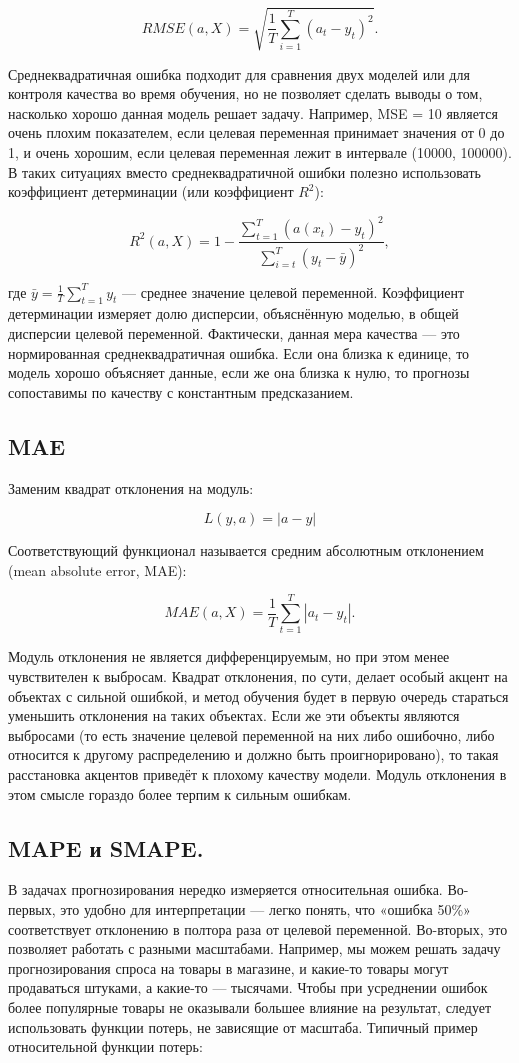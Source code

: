 \[
  RMSE(a, X) = \sqrt{\frac{1}{T} \sum_{i=1}^{T} (a_t - y_t)^2}.
\]

Среднеквадратичная ошибка подходит для сравнения двух моделей или для
контроля качества во время обучения, но не позволяет сделать выводы о
том, насколько хорошо данная модель решает задачу. Например, MSE = 10
является очень плохим показателем, если целевая переменная принимает
значения от 0 до 1, и очень хорошим, если целевая переменная лежит в
интервале (10000, 100000). В таких ситуациях вместо
среднеквадратичной ошибки полезно использовать коэффициент
детерминации (или коэффициент $R^2$):

\[
  R^2(a, X) = 1 - \frac{\sum_{t=1}^{T} (a(x_t) -
  y_t)^2}{\sum_{i=t}^{T} (y_t - \bar{y})^2},
\]

где $\bar{y} = \frac{1}{T} \sum_{t=1}^{T} y_t$ — среднее значение
целевой переменной. Коэффициент детерминации измеряет долю дисперсии,
объяснённую моделью, в общей дисперсии целевой переменной.
Фактически, данная мера качества — это нормированная
среднеквадратичная ошибка. Если она близка к единице, то модель
хорошо объясняет данные, если же она близка к нулю, то прогнозы
сопоставимы по качеству с константным предсказанием.

\subsection*{MAE}
Заменим квадрат отклонения на модуль:

\[
  L(y, a) = |a - y|
\]

Соответствующий функционал называется средним абсолютным отклонением
(mean absolute error, MAE):

\[
  MAE(a, X) = \frac{1}{T} \sum_{t=1}^{T} |a_t - y_t|.
\]

Модуль отклонения не является дифференцируемым, но при этом менее
чувствителен к выбросам. Квадрат отклонения, по сути, делает особый
акцент на объектах с сильной ошибкой, и метод обучения будет в первую
очередь стараться уменьшить отклонения на таких объектах. Если же эти
объекты являются выбросами (то есть значение целевой переменной на
  них либо ошибочно, либо относится к другому распределению и должно
быть проигнорировано), то такая расстановка акцентов приведёт к
плохому качеству модели. Модуль отклонения в этом смысле гораздо
более терпим к сильным ошибкам.

\subsection{MAPE и SMAPE.}
В задачах прогнозирования нередко измеряется
относительная ошибка. Во-первых, это удобно для интерпретации — легко
понять, что «ошибка 50\%» соответствует отклонению в полтора раза от
целевой переменной. Во-вторых, это позволяет работать с разными
масштабами. Например, мы можем решать задачу прогнозирования спроса
на товары в магазине, и какие-то товары могут продаваться штуками, а
какие-то — тысячами. Чтобы при усреднении ошибок более популярные
товары не оказывали большее влияние на результат, следует
использовать функции потерь, не зависящие от масштаба. Типичный
пример относительной функции потерь:

